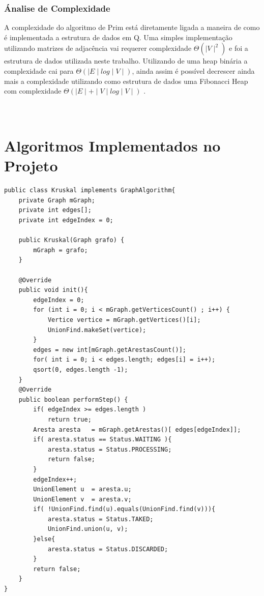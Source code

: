 \documentclass[a4paper,12pt]{article}
\begin{document}
\subsubsection{Ánalise de Complexidade}

A complexidade do algoritmo de Prim está diretamente ligada a maneira de como é implementada a estrutura de dados em Q. Uma simples implementação utilizando matrizes de adjacência vai requerer complexidade \emph{$\Theta(\mid V\mid^2)$} e foi a estrutura de dados utilizada neste trabalho. Utilizando de uma heap binária a complexidade cai para \emph{$\Theta(\mid E\mid log\mid V\mid)$}, ainda assim é possível decrescer ainda mais a complexidade utilizando como estrutura de dados uma Fibonacci Heap com complexidade \emph{$\Theta(\mid E\mid+\mid V\mid log\mid V\mid)$} \cite{Cormem}.


\newpage
\appendix
\section{\\Algoritmos Implementados no Projeto} \label{App:AppendixA}

\begin{lstlisting}[label=figura,title=Implementação do Algoritmo de Kruskal em Java]
public class Kruskal implements GraphAlgorithm{
	private Graph mGraph;
	private int edges[];
	private int edgeIndex = 0;
	
	public Kruskal(Graph grafo) {
		mGraph = grafo;
	}	

	@Override
	public void init(){
		edgeIndex = 0;
		for (int i = 0; i < mGraph.getVerticesCount() ; i++) {
			Vertice vertice = mGraph.getVertices()[i];
			UnionFind.makeSet(vertice);
		}
		edges = new int[mGraph.getArestasCount()];
		for( int i = 0; i < edges.length; edges[i] = i++);
		qsort(0, edges.length -1);
	}
	@Override
	public boolean performStep() {
		if( edgeIndex >= edges.length )
			return true;
		Aresta aresta 	= mGraph.getArestas()[ edges[edgeIndex]];
		if( aresta.status == Status.WAITING ){
			aresta.status = Status.PROCESSING;
			return false;
		}
		edgeIndex++;
		UnionElement u 	= aresta.u;
		UnionElement v 	= aresta.v;
		if( !UnionFind.find(u).equals(UnionFind.find(v))){
			aresta.status = Status.TAKED;
			UnionFind.union(u, v);
		}else{
			aresta.status = Status.DISCARDED;
		}
		return false;
	}
}
\end{lstlisting}
\end{document}
